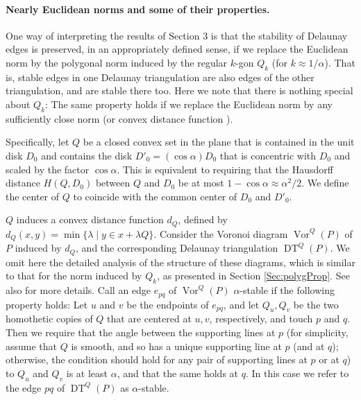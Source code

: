 \documentclass[letter,11pt]{article}
\def\DT{\mathop{\mathrm{DT}}}
\def\Vor{\mathop{\mathrm{Vor}}}
\begin{document}
\paragraph{Nearly Euclidean norms and some of their properties.}
One way of interpreting the results of Section 3 is that the stability of Delaunay edges is preserved, in an appropriately defined sense, if we replace the Euclidean norm by the polygonal norm induced by the regular $k$-gon $Q_k$ (for $k\approx 1/\alpha$). That is, stable edges in one Delaunay triangulation are also edges of the other triangulation, and are stable there too. Here we note that there is nothing special about $Q_k$: The same property holds if we replace the Euclidean norm by any sufficiently close norm (or convex distance function \cite{CD}).

Specifically, let $Q$ be a closed convex set in the plane that is contained in the
unit disk $D_0$ and contains the disk $D'_0 = (\cos\alpha) D_0$ that
is concentric with $D_0$ and scaled by the factor $\cos\alpha$.
This
is equivalent to requiring that the Hausdorff distance $H(Q,D_0)$ 
between $Q$ and $D_0$ be at most $1-\cos\alpha\approx \alpha^2/2$. 
We define the center of $Q$ to coincide with the common center of 
$D_0$ and $D'_0$.




$Q$ induces a convex distance function $d_Q$, defined by $d_Q(x,y)=\min \{\lambda\mid y\in x+\lambda Q\}$. Consider the Voronoi diagram $\Vor^Q(P)$
of $P$ induced by $d_Q$, and the corresponding Delaunay triangulation $\DT^Q(P)$. We omit here the detailed analysis of the structure of these diagrams, which is similar to that for the norm induced by $Q_k$, as presented in Section \ref{Sec:polygProp}. See also \cite{Chew,CD} for more details. Call an edge $e_{pq}$ of $\Vor^Q(P)$ $\alpha$-stable if the following property holds: Let $u$ and $v$ be the endpoints of $e_{pq}$, and let $Q_u,Q_v$ be the two homothetic copies of $Q$ that are centered at $u,v$, respectively, and touch $p$ and $q$. Then we require that the angle between the 
supporting lines at $p$
(for simplicity, assume that $Q$ is smooth, and so has a unique supporting line at $p$ (and at $q$); otherwise, the condition should hold for any pair of supporting lines at $p$ or at $q$) 
to $Q_u$ and $Q_v$ is at least $\alpha$, and that the same holds at $q$.
In this case we refer to the edge $pq$ of $\DT^Q(P)$ as $\alpha$-stable.
\end{document}
